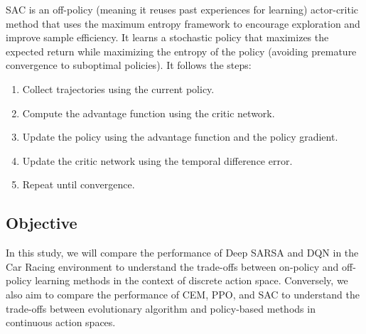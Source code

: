 \documentclass[../CSC_52081_EP.tex]{subfiles}
\begin{document}
    SAC is an off-policy (meaning it reuses past experiences for learning) actor-critic method that uses the maximum entropy framework to encourage exploration and improve sample efficiency. It learns a stochastic policy that maximizes the expected return while maximizing the entropy of the policy (avoiding premature convergence to suboptimal policies). It follows the steps:
    \begin{enumerate}
        \item Collect trajectories using the current policy.
        \item Compute the advantage function using the critic network.
        \item Update the policy using the advantage function and the policy gradient.
        \item Update the critic network using the temporal difference error.
        \item Repeat until convergence.
    \end{enumerate}

    \subsection{Objective}
    In this study, we will compare the performance of Deep SARSA and DQN in the Car Racing environment to understand the trade-offs between on-policy and off-policy learning methods in the context of discrete action space. Conversely, we also aim to compare the performance of CEM, PPO, and SAC to understand the trade-offs between evolutionary algorithm and policy-based methods in continuous action spaces.
\end{document}
